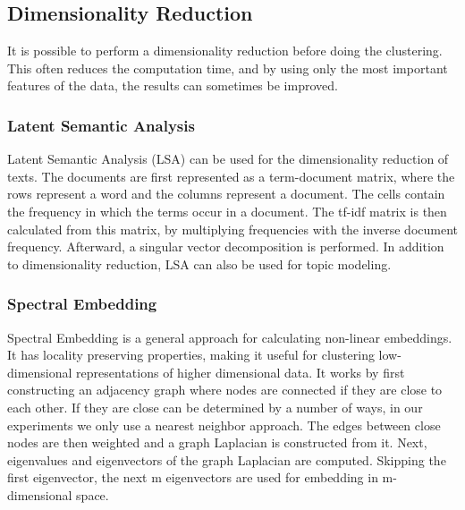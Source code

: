 \subsection{Dimensionality Reduction}
It is possible to perform a dimensionality reduction before doing the clustering.
This often reduces the computation time, and by using only the most important features of the data, the results can sometimes be improved.  

\subsubsection{Latent Semantic Analysis }
Latent Semantic Analysis (LSA) can be used for the dimensionality reduction of texts.
The documents are first represented as a term-document matrix, where the rows represent a word and the columns represent a document.
The cells contain the frequency in which the terms occur in a document.
The tf-idf matrix is then calculated from this matrix, by multiplying frequencies with the inverse document frequency.
Afterward, a singular vector decomposition is performed.\cite{lsa}
In addition to dimensionality reduction, LSA can also be used for topic modeling.

\subsubsection{Spectral Embedding}
Spectral Embedding is a general approach for calculating non-linear embeddings. It has locality preserving properties\cite{spectral_embedding_paper}, making it useful for clustering low-dimensional representations of higher dimensional data.
It works by first constructing an adjacency graph where nodes are connected if they are close to each other. If they are close can be determined by a number of ways, in our experiments we only use a nearest neighbor approach. The edges between close nodes are then weighted and a graph Laplacian is constructed from it. Next, eigenvalues and eigenvectors of the graph Laplacian are computed. Skipping the first eigenvector, the next m eigenvectors are used for embedding in m-dimensional space.\cite{spectral_embedding_paper}